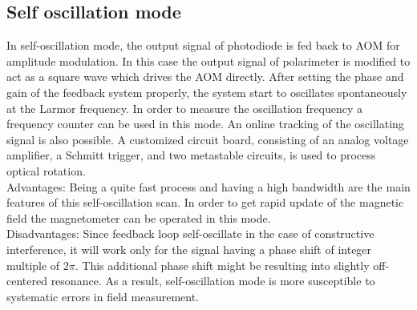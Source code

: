 \subsection{Self oscillation mode}
In self-oscillation mode\cite{PhysRevA.62.043403}, the output signal of photodiode is  fed back to AOM for  amplitude modulation. In this case the  output signal of polarimeter is modified to act as a square wave which drives the AOM directly. After setting the phase and gain of the feedback system properly, the system start to oscillates spontaneously  at the Larmor frequency. In order to measure the oscillation frequency a frequency counter can be used in this mode. An online tracking of the oscillating signal is also possible.
 A customized circuit board, consisting of an analog voltage amplifier, a Schmitt trigger, and two metastable circuits, is used to process optical rotation.\\
Advantages: Being a quite fast process and having a high bandwidth are the main features of this self-oscillation scan. In order to get rapid update of the magnetic field the magnetometer can be operated in this mode.\\
 Disadvantages: Since feedback loop self-oscillate in the case of constructive interference, it will work only for the signal having a phase shift of integer multiple of $ 2\pi$. This additional phase shift might be resulting into slightly off-centered resonance. As a result, self-oscillation mode is more susceptible to systematic errors in field measurement.


